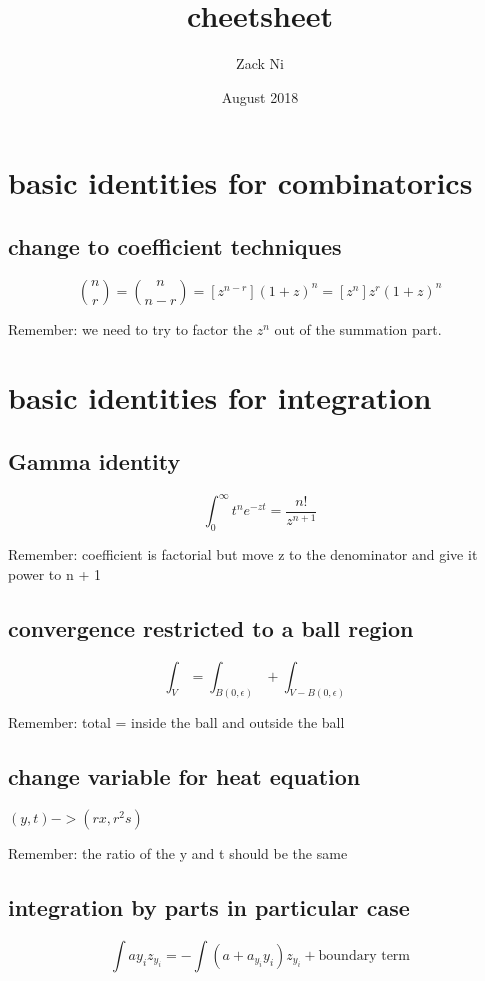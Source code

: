 \documentclass{article}
\title{cheetsheet}
\author{Zack Ni }
\date{August 2018}
\begin{document}
\maketitle

\section{basic identities for combinatorics}

\subsection{change to coefficient techniques}

$${{n}\choose{r}} = {{n}\choose{n-r}} = [z^{n-r}] (1+z)^n = [z^n] z^r(1+z)^n$$

Remember: we need to try to factor the $z^n$ out of the summation part. 

\section{basic identities for integration}

\subsection{Gamma identity}

$$\int_{0}^{\infty} t^n e^{-zt} = \frac{n!}{z^{n+1}} $$

Remember: coefficient is factorial but move z to the denominator and give it power to n + 1

\subsection{convergence restricted to a ball region}

$$\int_{V} = \int_{B(0,\epsilon)} + \int_{V-B(0,\epsilon)} $$

Remember: total = inside the ball and outside the ball

\subsection{change variable for heat equation}

$(y,t) ->(rx,r^2s)$

Remember: the ratio of the y and t should be the same 

\subsection{integration by parts in particular case}

$$\int a y_i z_{y_i} = - \int (a + a_{y_i} y_i)  z_{y_i} + \text{boundary term}$$
\end{document}
